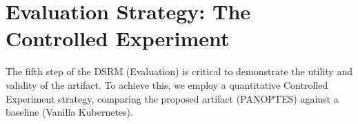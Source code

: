 \section{Evaluation Strategy: The Controlled Experiment}
\label{sec:evaluation}

The fifth step of the DSRM (Evaluation) is critical to demonstrate the utility and validity of the artifact. To achieve this, we employ a quantitative Controlled Experiment strategy, comparing the proposed artifact (PANOPTES) against a baseline (Vanilla Kubernetes).






